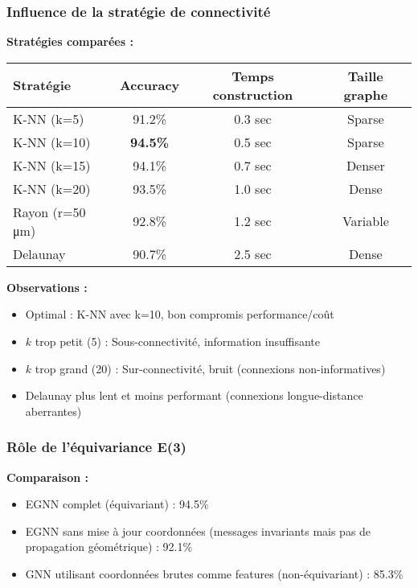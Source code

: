 \subsubsection{Influence de la stratégie de connectivité}

\textbf{Stratégies comparées :}

\begin{center}
\begin{tabular}{|l|c|c|c|}
\hline
\textbf{Stratégie} & \textbf{Accuracy} & \textbf{Temps construction} & \textbf{Taille graphe} \\
\hline
K-NN (k=5) & 91.2\% & 0.3 sec & Sparse \\
K-NN (k=10) & \textbf{94.5\%} & 0.5 sec & Sparse \\
K-NN (k=15) & 94.1\% & 0.7 sec & Denser \\
K-NN (k=20) & 93.5\% & 1.0 sec & Dense \\
Rayon (r=50 μm) & 92.8\% & 1.2 sec & Variable \\
Delaunay & 90.7\% & 2.5 sec & Dense \\
\hline
\end{tabular}
\end{center}

\textbf{Observations :}
\begin{itemize}
    \item Optimal : K-NN avec k=10, bon compromis performance/coût
    \item $k$ trop petit (5) : Sous-connectivité, information insuffisante
    \item $k$ trop grand (20) : Sur-connectivité, bruit (connexions non-informatives)
    \item Delaunay plus lent et moins performant (connexions longue-distance aberrantes)
\end{itemize}

\subsubsection{Rôle de l'équivariance E(3)}

\textbf{Comparaison :}
\begin{itemize}
    \item EGNN complet (équivariant) : 94.5\%
    \item EGNN sans mise à jour coordonnées (messages invariants mais pas de propagation géométrique) : 92.1\%
    \item GNN utilisant coordonnées brutes comme features (non-équivariant) : 85.3\%
\end{itemize}

